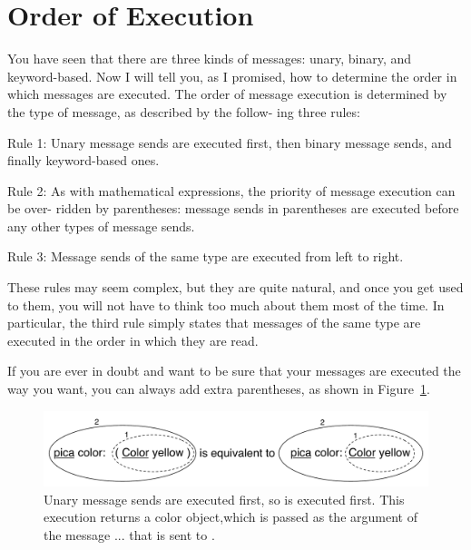 \documentclass[a4paper,10pt,twoside]{book}
\begin{document}

\section{Order of Execution}
You have seen that there are three kinds of messages: unary, binary, and keyword-based. Now 
I will tell you, as I promised, how to determine the order in which messages are executed. The 
order of message execution is determined by the type of message, as described by the follow- 
ing three rules: 

\begin{description}
\item Rule 1: Unary message sends are executed first, then binary message sends, and finally 
keyword-based ones. 
\item Rule 2: As with mathematical expressions, the priority of message execution can be over- 
ridden by parentheses: message sends in parentheses are executed before any other types of message sends. 
\item Rule 3: Message sends of the same type are executed from left to right. 
\end{description}

These rules may seem complex, but they are quite natural, and once you get used to them, 
you will not have to think too much about them most of the time. In particular, the third rule 
simply states that messages of the same type are executed in the order in which they are read. 

If you are ever in doubt and want to be sure that your messages are executed the way you 
want, you can always add extra parentheses, as shown in Figure~\ref{fig:uKeyUn}. 

\begin{figure}[h]
	\centerline{\includegraphics[width=\textwidth]{uKeyUn}}
	\caption{Unary message sends are executed first, so  is executed first. This execution returns a color object,which is passed as the argument of the message  ... that is 
	sent to . 
	\label{fig:uKeyUn}}
\end{figure}
\end{document}
